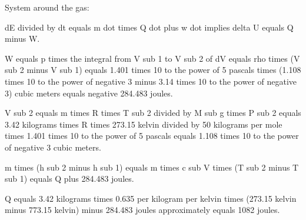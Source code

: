 System around the gas:

dE divided by dt equals m dot times Q dot plus w dot implies delta U equals Q minus W.

W equals p times the integral from V sub 1 to V sub 2 of dV equals rho times (V sub 2 minus V sub 1) equals 1.401 times 10 to the power of 5 pascals times (1.108 times 10 to the power of negative 3 minus 3.14 times 10 to the power of negative 3) cubic meters equals negative 284.483 joules.

V sub 2 equals m times R times T sub 2 divided by M sub g times P sub 2 equals 3.42 kilograms times R times 273.15 kelvin divided by 50 kilograms per mole times 1.401 times 10 to the power of 5 pascals equals 1.108 times 10 to the power of negative 3 cubic meters.

m times (h sub 2 minus h sub 1) equals m times c sub V times (T sub 2 minus T sub 1) equals Q plus 284.483 joules.

Q equals 3.42 kilograms times 0.635 per kilogram per kelvin times (273.15 kelvin minus 773.15 kelvin) minus 284.483 joules approximately equals 1082 joules.
